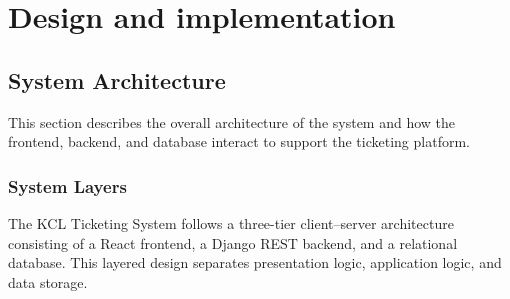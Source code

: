 \chapter{Design and implementation}
\label{chap:design}

\section{System Architecture}
This section describes the overall architecture of the system and how the frontend, backend, and database interact to support the ticketing platform.

\subsection{System Layers}

The KCL Ticketing System follows a three-tier client–server architecture consisting of a React frontend, a Django REST backend, and a relational database. This layered design separates presentation logic, application logic, and data storage.


